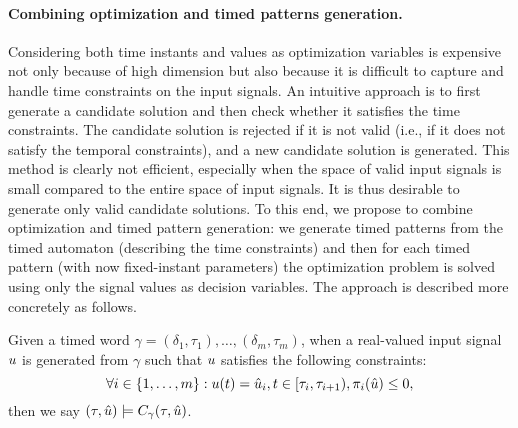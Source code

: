 
\paragraph{Combining optimization and timed patterns generation.} Considering  both time instants and values as optimization variables is expensive not only because of high dimension but also because it is difficult to capture and handle time constraints on the input signals. An intuitive approach is to first generate a candidate solution and then check whether it satisfies the time constraints. The candidate solution is rejected if it is not valid (i.e., if it does not satisfy the temporal constraints), and a new candidate solution is generated. This method is clearly not efficient, especially when the space of valid input signals is small compared to the entire space of input signals. It is thus desirable to generate only valid candidate solutions. To this end, we propose to combine optimization and timed pattern generation: we generate timed patterns from the timed automaton (describing the time constraints) and then for each timed pattern (with now fixed-instant parameters) the optimization problem is solved using only the signal values as decision variables. The approach is described more concretely as follows.

Given a timed word $\gamma = (\delta_1, \tau_1), \ldots, (\delta_m, \tau_m)$, when a real-valued input signal $u$ is generated from $\gamma$ such that $u$ satisfies the following constraints:
$$\forall i \in \{1, \ldots, m \}: u (t)= \hat{u}_i, t \in [\tau_i, \tau_{i+1}), \pi_i(\hat{u})  \le 0,$$
then we say $(\tau, \hat{u}) \models C_{\gamma}(\tau, \hat{u})$.

